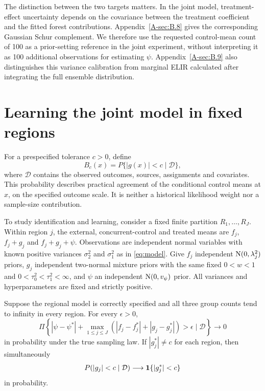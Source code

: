 \documentclass[11pt]{article}
\begin{document}
The distinction between the two targets matters. In the joint model, treatment-effect uncertainty depends on the covariance between the treatment coefficient and the fitted forest contributions. Appendix~\ref{A-sec:B.8} gives the corresponding Gaussian Schur complement. We therefore use the requested control-mean count of 100 as a prior-setting reference in the joint experiment, without interpreting it as 100 additional observations for estimating $\psi$. Appendix~\ref{A-sec:B.9} also distinguishes this variance calibration from marginal ELIR calculated after integrating the full ensemble distribution.

\section{Learning the joint model in fixed regions}\label{sec:theory}
For a prespecified tolerance $c>0$, define
\begin{equation}\label{eq:local}
B_c(x)=P\{|g(x)|<c\mid\mathcal D\},
\end{equation}
where $\mathcal D$ contains the observed outcomes, sources, assignments and covariates. This probability describes practical agreement of the conditional control means at $x$, on the specified outcome scale. It is neither a historical likelihood weight nor a sample-size contribution.

To study identification and learning, consider a fixed finite partition $R_1,\ldots,R_J$. Within region $j$, the external, concurrent-control and treated means are $f_j$, $f_j+g_j$ and $f_j+g_j+\psi$. Observations are independent normal variables with known positive variances $\sigma_2^2$ and $\sigma_1^2$ as in \eqref{eq:model}. Give $f_j$ independent $\mathrm{N}(0,\lambda_j^2)$ priors, $g_j$ independent two-normal mixture priors with the same fixed $0<w<1$ and $0<\tau_0^2<\tau_1^2<\infty$, and $\psi$ an independent $\mathrm{N}(0,v_\psi)$ prior. All variances and hyperparameters are fixed and strictly positive.

\begin{theorem}\label{thm:joint_learning}
Suppose the regional model is correctly specified and all three group counts tend to infinity in every region. For every $\epsilon>0$,
\[
\Pi\left\{|\psi-\psi^*|+
\max_{1\le j\le J}(|f_j-f_j^*|+|g_j-g_j^*|)>\epsilon\mid\mathcal D\right\}
\longrightarrow0
\]
in probability under the true sampling law. If $|g_j^*|\ne c$ for each region, then simultaneously
\[
P(|g_j|<c\mid\mathcal D)\longrightarrow\mathbf{1}\{|g_j^*|<c\}
\]
in probability.
\end{theorem}
\end{document}
